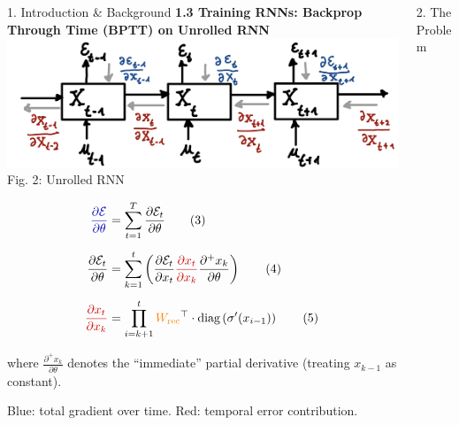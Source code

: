 \begin{frame}[t]
\begin{columns}[t,totalwidth=\textwidth]
\begin{column}{0.33\textwidth}
\begin{block}{1. Introduction \& Background}
        \vspace{1em}
        \textbf{1.3 Training RNNs: Backprop Through Time (BPTT) on Unrolled RNN}\\
        \includegraphics[width=0.95\linewidth]{figures/2_fig.png}\\[0.5em]
        Fig. 2: Unrolled RNN

        \vspace{0.3em}
        \begin{align*}
          \textcolor{myblue}{\frac{\partial \mathcal{E}}{\partial \theta}} &=
          \sum_{t=1}^{T} \frac{\partial \mathcal{E}_t}{\partial \theta} \hspace{2em} \text{(3)} \\[0.5em]
          \frac{\partial \mathcal{E}_t}{\partial \theta} &=
          \sum_{k=1}^{t} 
          \left( {\frac{\partial \mathcal{E}_t}{\partial x_t}} 
          \textcolor{myred}{\frac{\partial x_t}{\partial x_k}}
          \frac{\partial^+ x_k}{\partial \theta} \right) \hspace{2em} \text{(4)} \\[0.5em]
          \textcolor{myred}{\frac{\partial x_t}{\partial x_k}} &=
          \prod_{i=k+1}^{t}
          \textcolor{orange}{W_{\text{rec}}}^\top \cdot \text{diag}\left(\sigma'(x_{i-1})\right) \hspace{2em} \text{(5)}
        \end{align*}
        
        \vspace{0.5em}
        where $\frac{\partial^+ x_k}{\partial \theta}$ denotes the “immediate” partial derivative (treating $x_{k-1}$ as constant).
        
        \vspace{0.5em}
        \textcolor{myblue}{Blue}: total gradient over time.
        \quad
        \textcolor{myred}{Red}: temporal error contribution.

      \end{block}
    \end{column}

\begin{column}{0.33\textwidth}
    \begin{block}{2. The Problem}


\end{block}
\end{column}
\end{columns}
\end{frame}

